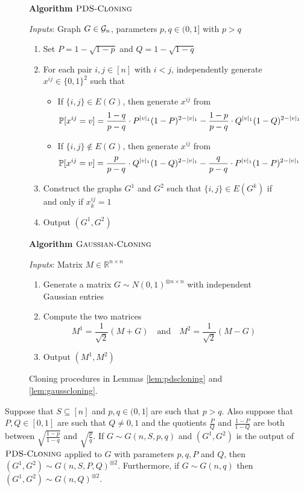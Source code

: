 \begin{figure}[t!]
\begin{algbox}
\textbf{Algorithm} $\textsc{PDS-Cloning}$
\vspace{2mm}

\textit{Inputs}: Graph $G \in \mathcal{G}_n$, parameters $p, q \in (0, 1]$ with $p > q$
\begin{enumerate}
\item Set $P = 1 - \sqrt{1 - p}$ and $Q = 1 - \sqrt{1 - q}$
\item For each pair $i, j \in [n]$ with $i < j$, independently generate $x^{ij} \in \{0, 1\}^2$ such that
\begin{itemize}
\item If $\{i, j\} \in E(G)$, then generate $x^{ij}$ from
$$\mathbb{P}[x^{ij} = v] = \frac{1 - q}{p - q} \cdot P^{|v|_1}(1 - P)^{2 - |v|_1} - \frac{1 - p}{p - q} \cdot Q^{|v|_1}(1 - Q)^{2 - |v|_1}$$
\item If $\{i, j\} \not \in E(G)$, then generate $x^{ij}$ from
$$\mathbb{P}[x^{ij} = v] = \frac{p}{p - q} \cdot Q^{|v|_1}(1 - Q)^{2 - |v|_1} - \frac{q}{p - q} \cdot P^{|v|_1}(1 - P)^{2 - |v|_1}$$
\end{itemize}
\item Construct the graphs $G^1$ and $G^2$ such that $\{i, j\} \in E(G^k)$ if and only if $x^{ij}_k = 1$
\item Output $(G^1, G^2)$
\end{enumerate}
\vspace{4mm}
\textbf{Algorithm} $\textsc{Gaussian-Cloning}$
\vspace{2mm}

\textit{Inputs}: Matrix $M \in \mathbb{R}^{n \times n}$
\begin{enumerate}
\item Generate a matrix $G \sim N(0, 1)^{\otimes n \times n}$ with independent Gaussian entries
\item Compute the two matrices
$$M^1 = \frac{1}{\sqrt{2}} (M + G) \quad \text{and} \quad M^2 = \frac{1}{\sqrt{2}} (M - G)$$
\item Output $(M^1, M^2)$
\end{enumerate}
\vspace{1mm}
\end{algbox}
\caption{Cloning procedures in Lemmas \ref{lem:pdscloning} and \ref{lem:gausscloning}.}
\end{figure}

\begin{lemma} \label{lem:pdscloning}
Suppose that $S \subseteq [n]$ and $p, q \in (0, 1]$ are such that $p > q$. Also suppose that $P, Q \in [0,1]$ are such that $Q \neq 0, 1$ and the quotients $\frac{P}{Q}$ and $\frac{1 - P}{1 - Q}$ are both between $\sqrt{\frac{1 - p}{1 - q}}$ and $\sqrt{\frac{p}{q}}$. If $G \sim G(n, S, p, q)$ and $(G^1, G^2)$ is the output of $\textsc{PDS-Cloning}$ applied to $G$ with parameters $p, q, P$ and $Q$, then $(G^1, G^2) \sim G(n, S, P, Q)^{\otimes 2}$. Furthermore, if $G \sim G(n, q)$ then $(G^1, G^2) \sim G(n, Q)^{\otimes 2}$.
\end{lemma}

